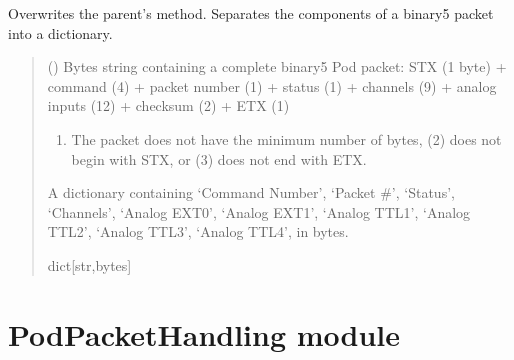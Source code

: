 \documentclass[letterpaper,10pt,english]{sphinxmanual}
\begin{document}
\begin{fulllineitems}
\begin{fulllineitems}
\label{\detokenize{PodDevice_8401HR:PodDevice_8401HR.POD_8401HR.UnpackPODpacket_Binary}}
\pysigstartsignatures
{}
\pysigstopsignatures
\sphinxAtStartPar
Overwrites the parent’s method. Separates the components of a binary5 packet into a dictionary.
\begin{quote}\begin{description}
\sphinxAtStartPar
{} () \textendash{} Bytes string containing a complete binary5 Pod packet:  STX (1 byte)                 + command (4) + packet number (1) + status (1) + channels (9) + analog inputs (12)                 + checksum (2) + ETX (1)

\sphinxAtStartPar
{} \textendash{} \begin{enumerate}
%
\item {} 
\sphinxAtStartPar
The packet does not have the minimum number of bytes, (2) does not begin                 with STX, or (3) does not end with ETX.

\end{enumerate}


\sphinxAtStartPar
A dictionary containing ‘Command Number’, ‘Packet \#’, ‘Status’, ‘Channels’,                 ‘Analog EXT0’, ‘Analog EXT1’, ‘Analog TTL1’, ‘Analog TTL2’, ‘Analog TTL3’, ‘Analog TTL4’,                 in bytes.

\sphinxAtStartPar
dict{[}str,bytes{]}

\end{description}\end{quote}

\end{fulllineitems}


\end{fulllineitems}


\sphinxstepscope


\section{PodPacketHandling module}
\label{\detokenize{PodPacketHandling:module-PodPacketHandling}}\label{\detokenize{PodPacketHandling:podpackethandling-module}}\label{\detokenize{PodPacketHandling::doc}}
\end{document}
